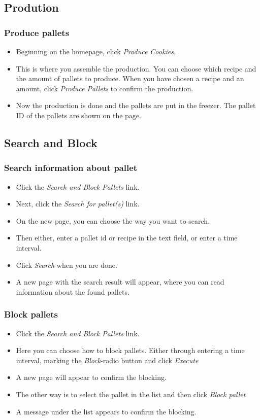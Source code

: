\documentclass[a4paper]{article}
\begin{document}
\subsection{Prodution}
\subsubsection{Produce pallets}
\begin{itemize}
  \item Beginning on the homepage, click \emph{Produce Cookies}.
  \item This is where you assemble the production. You can choose which recipe and the amount of pallets to produce. When you have chosen a recipe and an amount, click \emph{Produce Pallets} to confirm the production.
  \item Now the production is done and the pallets are put in the freezer. The pallet ID of the pallets are shown on the page.
\end{itemize}

\subsection{Search and Block}
\subsubsection{Search information about pallet}
\begin{itemize}
	\item Click the \emph{Search and Block Pallets} link.
	\item Next, click the \emph{Search for pallet(s)} link.
	\item On the new page, you can choose the way you want to search.
	\item Then either, enter a pallet id or recipe in the text field, or enter a time interval.
	\item Click \emph{Search} when you are done.
	\item A new page with the search result will appear, where you can read information about the found pallets.
\end{itemize}
\subsubsection{Block pallets}
\begin{itemize}
	\item Click the \emph{Search and Block Pallets} link.
	\item Here you can choose how to block pallets. Either through entering a time interval, marking the \emph{Block}-radio button and click \emph{Execute}
	\item A new page will appear to confirm the blocking.
	\item The other way is to select the pallet in the list and then click \emph{Block pallet}
	\item A message under the list appears to confirm the blocking.
\end{itemize}
\end{document}

